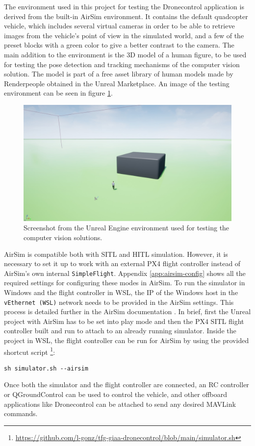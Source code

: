 The environment used in this project for testing the Dronecontrol application is derived from the built-in AirSim environment.
It contains the default quadcopter vehicle, which includes several virtual cameras in order to be able to retrieve images from the vehicle's point of view in the simulated world, and a few of the preset blocks with a green color to give a better contrast to the camera.
The main addition to the environment is the 3D model of a human figure, to be used for testing the pose detection and tracking mechanisms of the computer vision solution.
The model is part of a free asset library of human models made by Renderpeople \cite{render-people} obtained in the Unreal Marketplace.
An image of the testing environment can be seen in figure \ref{fig:unreal-env}.


\begin{figure}
  \centering
  \includegraphics[width=\textwidth,keepaspectratio]{img/unreal-env.jpg}
  \caption{Screenshot from the Unreal Engine environment used for testing the computer vision solutions.}
  \label{fig:unreal-env}
\end{figure}


AirSim is compatible both with SITL and HITL simulation.
However, it is necessary to set it up to work with an external PX4 flight controller instead of AirSim's own internal \texttt{SimpleFlight}.
Appendix \ref{app:airsim-config} shows all the required settings for configuring these modes in AirSim.
To run the simulator in Windows and the flight controller in WSL, the IP of the Windows host in the \texttt{vEthernet (WSL)} network needs to be provided in the AirSim settings.
This process is detailed further in the AirSim documentation \cite{airsim-doc-wsl}.
In brief, first the Unreal project with AirSim has to be set into play mode and then the PX4 SITL flight controller built and run to attach to an already running simulator.
Inside the project in WSL, the flight controller can be run for AirSim by using the provided shortcut script \footnote{\url{https://github.com/l-gonz/tfg-giaa-dronecontrol/blob/main/simulator.sh}}:
\begin{verbatim}
sh simulator.sh --airsim
\end{verbatim}
Once both the simulator and the flight controller are connected, an RC controller or QGroundControl can be used to control the vehicle, and other offboard applications like Dronecontrol can be attached to send any desired MAVLink commands.
